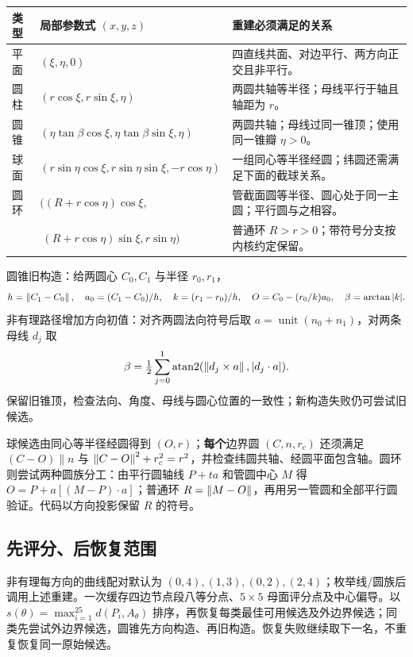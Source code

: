 \par{\small\begin{tabularx}{\linewidth}{@{}l l Y@{}}\toprule
类型 & 局部参数式 $(x,y,z)$ & 重建必须满足的关系\\\midrule
平面 & $(\xi,\eta,0)$ & 四直线共面、对边平行、两方向正交且非平行。\\
圆柱 & $(r\cos\xi,r\sin\xi,\eta)$ & 两圆共轴等半径；母线平行于轴且轴距为 $r$。\\
圆锥 & $(\eta\tan\beta\cos\xi,\eta\tan\beta\sin\xi,\eta)$ & 两圆共轴；母线过同一锥顶；使用同一锥瓣 $\eta>0$。\\
球面 & $(r\sin\eta\cos\xi,r\sin\eta\sin\xi,-r\cos\eta)$ & 一组同心等半径经圆；纬圆还需满足下面的截球关系。\\
圆环 & $((R+r\cos\eta)\cos\xi,$ & 管截面圆等半径、圆心处于同一主圆；平行圆与之相容。\\[-2pt]
 & $\ (R+r\cos\eta)\sin\xi,r\sin\eta)$ & 普通环 $R>r>0$；带符号分支按内核约定保留。\\\bottomrule
\end{tabularx}}

圆锥旧构造：给两圆心 $C_0,C_1$ 与半径 $r_0,r_1$，
\begin{equation}
 h=\left\lVert C_1-C_0\right\rVert,\quad a_0=(C_1-C_0)/h,\quad
 k=(r_1-r_0)/h,\quad O=C_0-(r_0/k)a_0,\quad\beta=\arctan|k|.
\end{equation}
非有理路径增加方向初值：对齐两圆法向符号后取 $a=\operatorname{unit}(n_0+n_1)$，对两条母线 $d_j$ 取
\begin{equation}
 \beta=\tfrac12\sum_{j=0}^1\operatorname{atan2}(\left\lVert d_j\times a\right\rVert,|d_j\cdot a|).
\end{equation}
保留旧锥顶，检查法向、角度、母线与圆心位置的一致性；新构造失败仍可尝试旧候选。

球候选由同心等半径经圆得到 $(O,r)$；\textbf{每个}边界圆 $(C,n,r_c)$ 还须满足 $(C-O)\parallel n$ 与 $\left\lVert C-O\right\rVert^2+r_c^2=r^2$，并检查纬圆共轴、经圆平面包含轴。圆环则尝试两种圆族分工：由平行圆轴线 $P+ta$ 和管圆中心 $M$ 得 $O=P+a[(M-P)\cdot a]$；普通环 $R=\left\lVert M-O\right\rVert$，再用另一管圆和全部平行圆验证。代码以方向投影保留 $R$ 的符号。

\subsection{先评分、后恢复范围}
非有理每方向的曲线配对默认为 $(0,4),(1,3),(0,2),(2,4)$；枚举线/圆族后调用上述重建。一次缓存四边节点段八等分点、$5\times5$ 母面评分点及中心偏导。以 $s(\theta)=\max_{i=1}^{25}d(P_i,A_\theta)$ 排序，再恢复每类最佳可用候选及外边界候选；同类先尝试外边界候选，圆锥先方向构造、再旧构造。恢复失败继续取下一名，不重复恢复同一原始候选。

